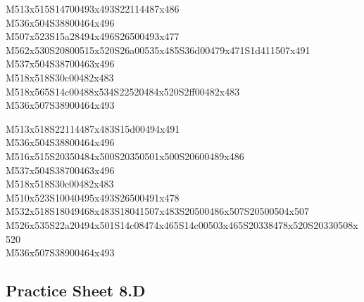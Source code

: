 \documentclass{article}
\begin{document}
\begin{multicols}{5}
\begin{center}
M513x515S14700493x493S22114487x486 %
\\M536x504S38800464x496 %
\\M507x523S15a28494x496S26500493x477 %
\\M562x530S20800515x520S26a00535x485S36d00479x471S1d411507x491 %
\\M537x504S38700463x496 %
\\M518x518S30c00482x483 %
\\M518x565S14c00488x534S22520484x520S2ff00482x483 %
\\M536x507S38900464x493 %
\vfil
\columnbreak

M513x518S22114487x483S15d00494x491 %
\\M536x504S38800464x496 %
\\M516x515S20350484x500S20350501x500S20600489x486 %
\\M537x504S38700463x496 %
\\M518x518S30c00482x483 %
\\M510x523S10040495x493S26500491x478 %
\\M532x518S18049468x483S18041507x483S20500486x507S20500504x507 %
\\M526x535S22a20494x501S14c08474x465S14c00503x465S20338478x520S20330508x520 %
\\M536x507S38900464x493 %
\vfil

\end{center}
\end{multicols}

\subsection{Practice Sheet 8.D}
\end{document}
